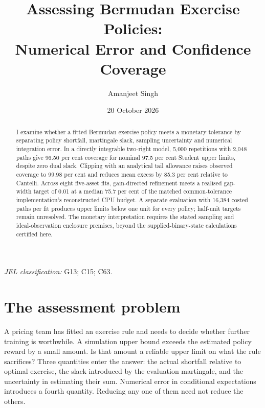 \documentclass[11pt]{article}
\title{Assessing Bermudan Exercise Policies:\\Numerical Error and Confidence Coverage}
\author{Amanjeet Singh}
\date{20 October 2026}
\begin{document}
\maketitle
\begin{abstract}
\noindent I examine whether a fitted Bermudan exercise policy meets a monetary tolerance by separating policy shortfall, martingale slack, sampling uncertainty and numerical integration error. In a directly integrable two-right model, 5,000 repetitions with 2,048 paths give 96.50 per cent coverage for nominal 97.5 per cent Student upper limits, despite zero dual slack. Clipping with an analytical tail allowance raises observed coverage to 99.98 per cent and reduces mean excess by 85.3 per cent relative to Cantelli. Across eight five-asset fits, gain-directed refinement meets a realised gap-width target of 0.01 at a median 75.7 per cent of the matched common-tolerance implementation's reconstructed CPU budget. A separate evaluation with 16,384 costed paths per fit produces upper limits below one unit for every policy; half-unit targets remain unresolved. The monetary interpretation requires the stated sampling and ideal-observation enclosure premises, beyond the supplied-binary-state calculations certified here.
\end{abstract}
\smallskip
\newlength{\keywordwidth}
\ifdim\keywordwidth>\textwidth
\PackageError{manuscript}{The keywords exceed the text width}{Shorten the keyword list.}
\fi
\noindent{}
\par\smallskip
\noindent\textit{JEL classification:} G13; C15; C63.

\section{The assessment problem}

A pricing team has fitted an exercise rule and needs to decide whether further training is worthwhile. A simulation upper bound exceeds the estimated policy reward by a small amount. Is that amount a reliable upper limit on what the rule sacrifices? Three quantities enter the answer: the actual shortfall relative to optimal exercise, the slack introduced by the evaluation martingale, and the uncertainty in estimating their sum. Numerical error in conditional expectations introduces a fourth quantity. Reducing any one of them need not reduce the others.
\end{document}
